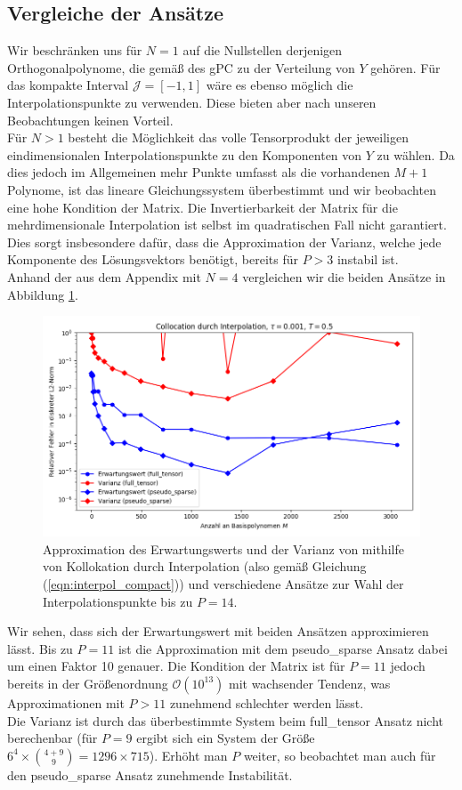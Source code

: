\subsection{Vergleiche der Ansätze}
Wir beschränken uns für $N=1$ auf die Nullstellen derjenigen Orthogonalpolynome, die gemäß des gPC zu der Verteilung von $Y$ gehören. Für das kompakte Interval $\mathcal{J}=[-1,1]$ wäre es ebenso möglich die \chebyspace Interpolationspunkte zu verwenden. Diese bieten aber nach unseren Beobachtungen keinen Vorteil.\\
Für $N>1$ besteht die Möglichkeit das volle Tensorprodukt der jeweiligen eindimensionalen Interpolationspunkte zu den Komponenten von $Y$ zu wählen. Da dies jedoch im Allgemeinen mehr Punkte umfasst als die vorhandenen $M+1$ Polynome, ist das lineare Gleichungssystem überbestimmt und wir beobachten eine hohe Kondition der Matrix. Die Invertierbarkeit der Matrix für die mehrdimensionale Interpolation ist selbst im quadratischen Fall nicht garantiert. Dies sorgt insbesondere dafür, dass die Approximation der Varianz, welche jede Komponente des Lösungsvektors benötigt, bereits für $P>3$ instabil ist.\\
Anhand der  aus dem Appendix mit $N=4$ vergleichen wir die beiden Ansätze in Abbildung \ref{fig:Kollokation_trial8}. 
\begin{figure}[!htb]
\centering
\includegraphics[width=\linewidth]{Figures/collocation_mi_trial8_ft_pseudosparse.png}
\caption{Approximation des Erwartungswerts und der Varianz von  mithilfe von Kollokation durch Interpolation (also gemäß Gleichung (\ref{eqn:interpol_compact})) und verschiedene Ansätze zur Wahl der Interpolationspunkte bis zu $P=14$.}
\label{fig:Kollokation_trial8}
\end{figure}
Wir sehen, dass sich der Erwartungswert mit beiden Ansätzen approximieren lässt. Bis zu $P=11$ ist die Approximation mit dem pseudo\_sparse Ansatz dabei um einen Faktor 10 genauer. Die Kondition der Matrix ist für $P=11$ jedoch bereits in der Größenordnung $\mathcal{O}(10^{13})$ mit wachsender Tendenz, was Approximationen mit $P>11$ zunehmend schlechter werden lässt.\\
Die Varianz ist durch das überbestimmte System beim full\_tensor Ansatz nicht berechenbar (für $P=9$ ergibt sich ein System der Größe $6^4\times \binom{4+9}{9} =1296\times 715$). Erhöht man $P$ weiter, so beobachtet man auch für den pseudo\_sparse Ansatz zunehmende Instabilität.

